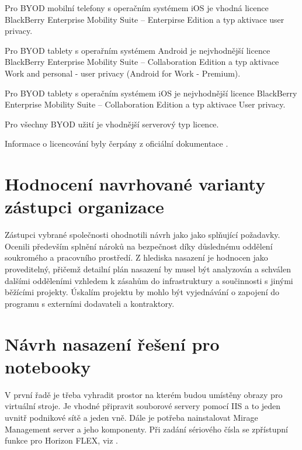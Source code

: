 Pro BYOD mobilní telefony s operačním systémem iOS je vhodná licence BlackBerry Enterprise Mobility Suite -- Enterpirse Edition a typ aktivace user privacy.

Pro BYOD tablety s operařním systémem Android je nejvhodnější licence BlackBerry Enterprise Mobility Suite -- Collaboration Edition a typ aktivace Work and personal - user privacy (Android for Work - Premium).

Pro BYOD tablety s operačním systémem iOS je nejvhodnější licence BlackBerry Enterprise Mobility Suite -- Collaboration Edition a typ aktivace User privacy.

Pro všechny BYOD užití je vhodnější serverový typ licence.

Informace o licencování byly čerpány z oficiální dokumentace \cite{BBLicence}.%

\section{Hodnocení navrhované varianty zástupci organizace}
Zástupci vybrané společnosti ohodnotili návrh jako jako splňující požadavky. Ocenili především splnění nároků na bezpečnost díky důslednému oddělení soukromého a pracovního prostředí. Z hlediska nasazení je hodnocen jako proveditelný, přičemž detailní plán nasazení by musel být analyzován a schválen dalšími odděleními vzhledem k zásahům do infrastruktury a součinnosti s jinými běžícími projekty. 
Úskalím projektu by mohlo být vyjednávání o zapojení do programu s externími dodavateli a kontraktory.

\section{Návrh nasazení řešení pro notebooky}

V první řadě je třeba vyhradit prostor na kterém budou umístěny obrazy pro virtuální stroje. Je vhodné připravit souborové servery pomocí IIS a to jeden uvnitř podnikové sítě a jeden vně. Dále je potřeba nainstalovat Mirage Management server a jeho komponenty. Při zadání sériového čísla se zpřístupní funkce pro Horizon FLEX, viz \cite{FlexDeployment}. 


